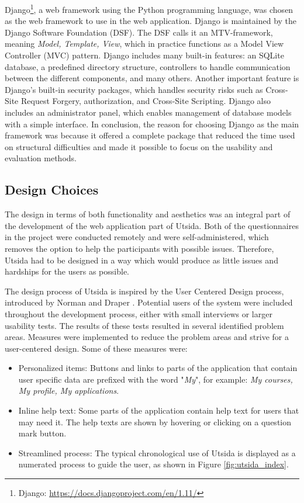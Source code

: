 Django\footnote{Django: \url{https://docs.djangoproject.com/en/1.11/}}, a web framework using the Python programming language, was chosen as the web framework to use in the web application. Django is maintained by the Django Software Foundation (DSF). The DSF calls it an MTV-framework, meaning \emph{Model, Template, View}, which in practice functions as a Model View Controller (MVC) pattern. Django includes many built-in features: an SQLite database, a predefined directory structure, controllers to handle communication between the different components, and many others. Another important feature is Django's built-in security packages, which handles security risks such as Cross-Site Request Forgery, authorization, and Cross-Site Scripting. Django also includes an administrator panel, which enables management of database models with a simple interface. In conclusion, the reason for choosing Django as the main framework was because it offered a complete package that reduced the time used on structural difficulties and made it possible to focus on the usability and evaluation methods.

\subsection{Design Choices}
The design in terms of both functionality and aesthetics was an integral part of the development of the web application part of Utsida. Both of the questionnaires in the project were conducted remotely and were self-administered, which removes the option to help the participants with possible issues. Therefore, Utsida had to be designed in a way which would produce as little issues and hardships for the users as possible.

The design process of Utsida is inspired by the User Centered Design process, introduced by Norman and Draper \cite{norman1986user}. Potential users of the system were included throughout the development process, either with small interviews or larger usability tests. The results of these tests resulted in several identified problem areas. Measures were implemented to reduce the problem areas and strive for a user-centered design. Some of these measures were:

\begin{itemize}
    \item Personalized items: Buttons and links to parts of the application that contain user specific data are prefixed with the word "\emph{My}", for example: \emph{My courses, My profile, My applications}.
    \item Inline help text: Some parts of the application contain help text for users that may need it. The help texts are shown by hovering or clicking on a question mark button. 
    \item Streamlined process: The typical chronological use of Utsida is displayed as a numerated process to guide the user, as shown in Figure \ref{fig:utsida_index}.
\end{itemize}

